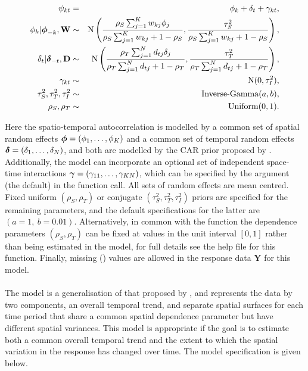 \documentclass[article, nojss]{jss}
\newcommand{\bd}[1]{\ensuremath{\mbox{\boldmath $#1$}}}
\begin{document}
\begin{eqnarray}
\psi_{kt}&=&\phi_k +  \delta_t   + \gamma_{kt},\label{caranova}\\
\phi_k|\bd{\phi}_{-k},\mathbf{W}&\sim&\mbox{N}\left(\frac{\rho_{S}\sum_{j=1}^Kw_{kj}\phi_j}{\rho_{S}\sum_{j=1}^Kw_{kj} + 1-\rho_{S}}, \frac{\tau^2_{S}}{\rho_{S}\sum_{j=1}^Kw_{kj} + 1-\rho_{S}}\right),\nonumber\\
\delta_t|\bd{\delta}_{-t},\mathbf{D}&\sim&\mbox{N}\left(\frac{\rho_{T}\sum_{j=1}^N d_{tj}\delta_j}{\rho_{T}\sum_{j=1}^N d_{tj} + 1-\rho_{T}}, \frac{\tau^2_{T}}{\rho_{T}\sum_{j=1}^N d_{tj}+1-\rho_{T}}\right),\nonumber\\
\gamma_{kt}&\sim&\mbox{N}(0, \tau^2_{I} ),\nonumber\\
\tau^2_{S}, \tau^2_{T}, \tau^2_{I}&\sim&\mbox{Inverse-Gamma}(a,b),\nonumber\\
\rho_{S},\rho_{T}&\sim&\mbox{Uniform}(0,1).\nonumber
\end{eqnarray}


Here the spatio-temporal autocorrelation is modelled by a common set of spatial random effects $\bd{\phi}=(\phi_1,\ldots,\phi_K)$ and a common set of temporal random effects  $\bd{\delta}=(\delta_1,\ldots,\delta_N)$, and both are modelled by the CAR prior proposed by \cite{leroux2000}. Additionally, the model can incorporate an optional set of independent space-time interactions $\bd{\gamma}=(\gamma_{11},\ldots,\gamma_{KN})$, which can be specified by the argument  (the default) in the function call. All sets of random effects are mean centred. Fixed uniform $(\rho_{S},\rho_{T})$  or conjugate $(\tau^2_{S}, \tau^2_{T}, \tau^2_{I})$ priors are specified for the remaining parameters, and the default specifications for the latter are $(a=1,~ b=0.01)$. Alternatively, in common with the  function the  dependence parameters $(\rho_{S}, \rho_{T})$ can be fixed at values in the unit interval $[0,1]$ rather than being estimated in the model, for full details see the help file for this function. Finally, missing () values are allowed in the response data $\mathbf{Y}$ for this model.\\


\\
The model is a generalisation of that proposed by \cite{napier2016}, and represents the data by two components,  an overall temporal trend, and separate spatial surfaces for each time period that share a common spatial dependence parameter but have different spatial variances. This model is appropriate if the goal is to estimate both a common overall temporal trend and the extent to which the spatial variation in the response has changed over time. The model specification is given below.
\end{document}
